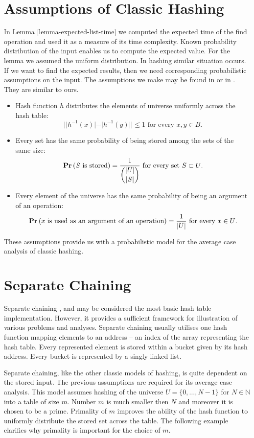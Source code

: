 \section{Assumptions of Classic Hashing}
\label{section-assumptions}
In Lemma \ref{lemma-expected-list-time} we computed the expected time of the find operation and used it as a measure of its time complexity. Known probability distribution of the input enables us to compute the expected value. For the lemma we assumed the uniform distribution. In hashing similar situation occurs. If we want to find the expected results, then we need corresponding probabilistic assumptions on the input. The assumptions we make may be found in \cite{VK-skripta} or in \cite{DBLP:books/sp/Mehlhorn84}. They are similar to ours.
\begin{itemize}
\item Hash function $h$ distributes the elements of universe uniformly across the hash table:
\[
||h^{-1}(x)| - |h^{-1}(y)|| \leq 1 \text{ for every }x, y \in B \text{.}
\]
\item Every set has the same probability of being stored among the sets of the same size:
\[
\mathbf{Pr}\left(S \text{ is stored}\right) = \frac{1}{\dbinom{|U|}{|S|}} \text{ for every set } S \subset U \text{.}
\]
\item Every element of the universe has the same probability of being an argument of an operation:
\[
\mathbf{Pr}\left(x \text{ is used as an argument of an operation}\right) = \frac{1}{|U|} \text{ for every } x \in U \text{.}
\]
\end{itemize}

These assumptions provide us with a probabilistic model for the average case analysis of classic hashing.

\section{Separate Chaining}
Separate chaining \cite{The-art-of-computer-programming}, \cite{DBLP:books/sp/Mehlhorn84} and \cite{DBLP:books/sp/MehlhornS2008} may be considered the most basic hash table implementation. However, it provides a sufficient framework for illustration of various problems and analyses. Separate chaining usually utilises one hash function mapping elements to an address -- an index of the array representing the hash table. Every represented element is stored within a bucket given by its hash address. Every bucket is represented by a singly linked list. 

Separate chaining, like the other classic models of hashing, is quite dependent on the stored input. The previous assumptions are required for its average case analysis. This model assumes hashing of the universe $U = \{0, \dots, N - 1\}$ for $N \in \mathbb{N}$ into a table of size $m$. Number $m$ is much smaller then $N$ and moreover it is chosen to be a prime. Primality of $m$ improves the ability of the hash function to uniformly distribute the stored set across the table.  The following example clarifies why primality is important for the choice of $m$.


